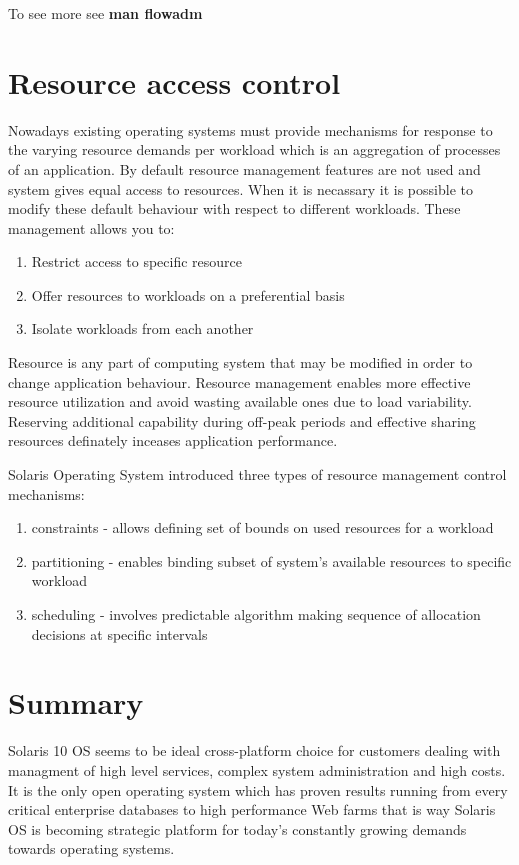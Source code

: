 \documentclass[11pt]{book}
\begin{document}
                        To see more see \textbf{man flowadm}
        

    \section{Resource access control}

                Nowadays existing operating systems must provide mechanisms for response to the varying resource 
		demands per workload which is an aggregation of processes of an application. By default resource management
		features are not used and system gives equal access to resources. When it is necassary it is possible 
		to modify these default behaviour with respect to different workloads. These management allows you to:
		\begin{enumerate}
        	\item{Restrict access to specific resource}
			\item{Offer resources to workloads on a preferential basis}
			\item{Isolate workloads from each another}
		\end{enumerate}
	
		Resource is any part of computing system that may be modified in order to change application behaviour. Resource management enables more 
		effective resource utilization and avoid wasting available ones due to load variability. Reserving additional capability
		during off-peak periods and effective sharing resources definately inceases application performance.
		
		Solaris Operating System introduced three types of resource management control mechanisms:
		\begin{enumerate}
        	\item{constraints - allows defining set of bounds on used resources for a workload}
			\item{partitioning - enables binding subset of system's available resources to specific workload}
			\item{scheduling - involves predictable algorithm making sequence of allocation decisions at specific intervals}
		 \end{enumerate}
                

    \section*{Summary}

                Solaris 10 OS seems to be ideal cross-platform choice for customers dealing with managment of high level services, complex system administration and high costs. It is the only open operating system which has proven 
                results running from every critical enterprise databases to high performance Web farms that is way Solaris OS is becoming strategic platform for today's constantly growing demands towards operating systems.
\end{document}
